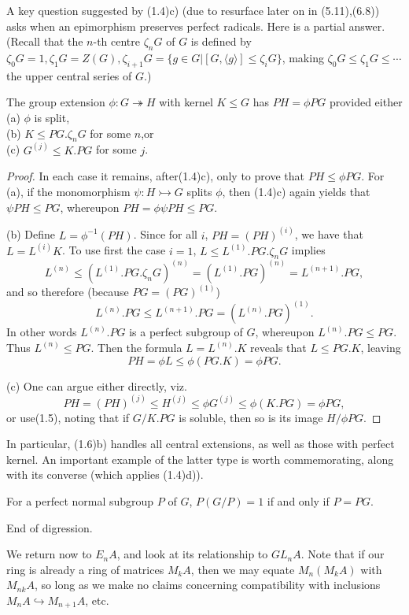 A key question suggested by (1.4)c) (due to resurface later on in (5.11),(6.8)) asks when an epimorphism preserves perfect radicals. Here is a partial answer. (Recall that the $n$-th centre $\zeta_n G$ of $G$ is defined by $\zeta_0 G=1,\zeta_1G=Z(G),\zeta_{i+1}G=\{g\in G|[G,\langle g\rangle]\leqslant \zeta_iG\}$, making
$\zeta_0 G\leqslant \zeta_1 G\leqslant \cdots$ the upper central series of $G$.)
\begin{prop}
The group extension $\phi:G\twoheadrightarrow H$ with kernel $K\leqslant G$ has $PH = \phi PG$ provided either\\
(a) $\phi$ is split,\\
(b) $K\leqslant PG.\zeta_n G$ for some $n$,or\\
(c) $G^{(j)}\leqslant K.PG$ for some $j$.
\end{prop}
\begin{proof}
In each case it remains, after(1.4)c), only to prove that $PH \leqslant \phi PG$. For (a), if the monomorphism $\psi:H\rightarrowtail G$ splits $\phi$, then (1.4)c) again yields that $\psi PH \leqslant  PG$, whereupon $PH=\phi \psi PH\leqslant PG$.

(b) Define $L=\phi^{-1}(PH)$. Since for all $i$, $PH=(PH)^{(i)}$, we have that $L=L^{(i)}K$. To use first the case $i=1$, $L\leqslant L^{(1)}.PG.\zeta_n G$ implies
\[L^{(n)}\leqslant (L^{(1)}.PG.\zeta_n G)^{(n)}=(L^{(1)}.PG)^{(n)}=L^{(n+1)}.PG,\]
and so therefore (because $PG=(PG)^{(1)}$)
\[L^{(n)}.PG\leqslant L^{(n+1)}.PG=(L^{(n)}.PG)^{(1)}.\]
In other words $L^{(n)}.PG$ is a perfect subgroup of $G$, whereupon $L^{(n)}.PG\leqslant PG$. Thus $L^{(n)}\leqslant PG$. Then the formula $L=L^{(n)}.K$ reveals that $L\leqslant PG.K$, leaving
\[PH=\phi L\leqslant \phi(PG.K)=\phi PG.\]

(c) One can argue either directly, viz.
\[PH=(PH)^{(j)}\leqslant H^{(j)} \leqslant  \phi G^{(j)} \leqslant \phi(K.PG)=\phi PG,\]
or use(1.5), noting that if $G/K.PG$ is soluble, then so is its image $H/\phi PG$. 
\end{proof}

In particular, (1.6)b) handles all central extensions, as well as those with perfect kernel. An important example of the latter type is worth commemorating, along with its converse (which applies (1.4)d)).
\begin{prop}
For a perfect normal subgroup $P$ of $G$, $P(G/P)=1$ if and only if $P=PG$.
\end{prop}
End of digression.

We return now to $E_n A$, and look at its relationship to $GL_nA$. Note that if our ring is already a ring of matrices $M_kA$, then we may equate $M_n(M_k A)$ with $M_{nk}A$, so long as we make no claims concerning compatibility with inclusions $M_nA\hookrightarrow M_{n+1}A$, etc.

